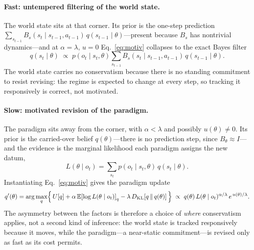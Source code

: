 \documentclass[11pt,a4paper]{article}
\newcommand{\theory}{\theta}
\newcommand{\qb}{q}
\newcommand{\KL}[2]{D_{\mathrm{KL}}\!\left[#1\,\|\,#2\right]}
\newcommand{\E}[1]{\mathbb{E}\!\left[#1\right]}
\begin{document}
\paragraph{Fast: untempered filtering of the world state.}
The world state sits at that corner. Its prior is the one-step prediction
$\sum_{s_{t-1}}B_s(s_t\mid s_{t-1},a_{t-1})\,q(s_{t-1}\mid\theory)$---present because
$B_s$ has nontrivial dynamics---and at $\alpha=\lambda$, $u=0$ Eq.~\eqref{eq:motiv}
collapses to the exact Bayes filter
\begin{equation}
q(s_t\mid\theory)\;\propto\;p(o_t\mid s_t,\theory)
   \sum_{s_{t-1}} B_s(s_t\mid s_{t-1},a_{t-1})\,q(s_{t-1}\mid\theory).
\label{eq:fast}
\end{equation}
The world state carries no conservatism because there is no standing commitment to
resist revising: the regime is expected to change at every step, so tracking it
responsively is correct, not motivated.

\paragraph{Slow: motivated revision of the paradigm.}
The paradigm sits away from the corner, with $\alpha<\lambda$ and possibly
$u(\theory)\neq0$. Its prior is the carried-over belief $q(\theory)$---there is no
prediction step, since $B_\theory\approx I$---and the evidence is the marginal
likelihood each paradigm assigns the new datum,
\begin{equation}
L(\theory\mid o_t)=\sum_{s_t} p(o_t\mid s_t,\theory)\,q(s_t\mid\theory).
\label{eq:marglik}
\end{equation}
Instantiating Eq.~\eqref{eq:motiv} gives the paradigm update
\begin{equation}
q'(\theory)=\arg\max_{\qb}\Bigl\{\,U[\qb]+\alpha\,\E{\log L(\theory\mid o_t)}_{\qb}
   -\lambda\,\KL{\qb}{q(\theory)}\,\Bigr\}
\;\propto\;q(\theory)\,L(\theory\mid o_t)^{\alpha/\lambda}\,e^{\,u(\theory)/\lambda}.
\label{eq:slow}
\end{equation}
The asymmetry between the factors is therefore a choice of \emph{where} conservatism
applies, not a second kind of inference: the world state is tracked responsively
because it moves, while the paradigm---a near-static commitment---is revised only as
fast as its cost permits.
\end{document}
